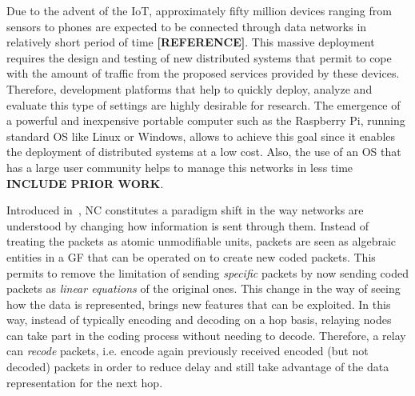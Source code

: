 %

Due to the advent of the \ac{IoT}, approximately fifty million devices
ranging from sensors to phones are expected to be connected through
data networks in relatively short period of time \textbf{[REFERENCE]}.
This massive deployment requires the design and testing of new
distributed systems that permit to cope with the amount of traffic
from the proposed services provided by these devices. Therefore,
development platforms that help to quickly deploy, analyze and
evaluate this type of settings are highly desirable for research.
The emergence of a powerful and inexpensive portable computer such
as the Raspberry Pi, running standard \ac{OS} like Linux or Windows,
allows to achieve this goal since it enables the deployment
of distributed systems at a low cost. Also, the use of an \ac{OS} that
has a large user community helps to manage this networks in less time
\textbf{INCLUDE PRIOR WORK}.

Introduced in~\cite{ahlswede2000network}, \ac{NC}
constitutes a paradigm shift in the way networks are understood
by changing how information is sent through them.
Instead of treating the packets as atomic
unmodifiable units, packets are seen as algebraic entities in a \ac{GF}
that can be operated on to create new coded packets. This permits to
remove the limitation of sending \textit{specific} packets by now sending
coded packets as \textit{linear equations} of the original ones. This
change in the way of seeing how the data is represented, brings new
features that can be exploited. In this way, instead of typically encoding
and decoding on a hop basis, relaying nodes can take part in the
coding process without needing to decode. Therefore, a relay can
\textit{recode} packets, i.e. encode again previously received encoded
(but not decoded) packets in order to reduce delay and still
take advantage of the data representation for the next hop.

